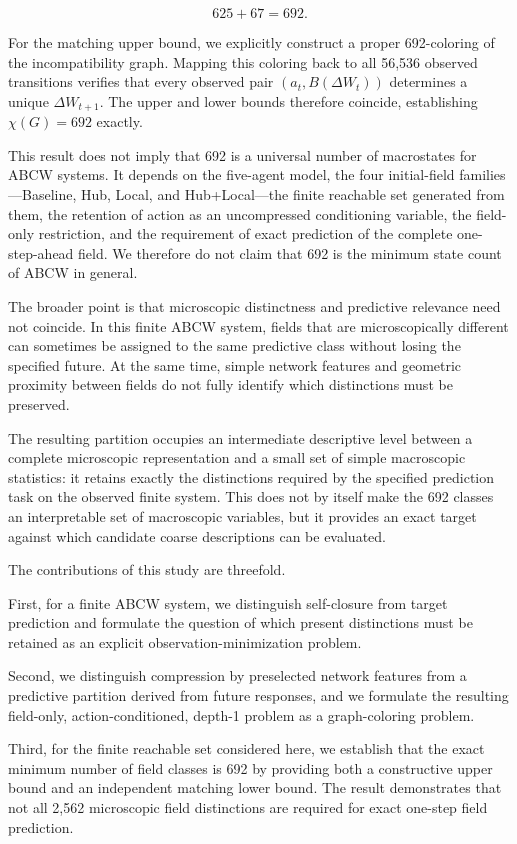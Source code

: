 \documentclass[
  11pt,
]{article}
\begin{document}
\[{625+67=692.}\]

For the matching upper bound, we explicitly construct a proper
692-coloring of the incompatibility graph. Mapping this coloring back to
all 56,536 observed transitions verifies that every observed pair
\({(a_t,B(\Delta W_t))}\) determines a unique \({\Delta W_{t+1}}\). The
upper and lower bounds therefore coincide, establishing
\({\chi(G)=692}\) exactly.

This result does not imply that 692 is a universal number of macrostates
for ABCW systems. It depends on the five-agent model, the four
initial-field families---Baseline, Hub, Local, and Hub+Local---the
finite reachable set generated from them, the retention of action as an
uncompressed conditioning variable, the field-only restriction, and the
requirement of exact prediction of the complete one-step-ahead field. We
therefore do not claim that 692 is the minimum state count of ABCW in
general.

The broader point is that microscopic distinctness and predictive
relevance need not coincide. In this finite ABCW system, fields that are
microscopically different can sometimes be assigned to the same
predictive class without losing the specified future. At the same time,
simple network features and geometric proximity between fields do not
fully identify which distinctions must be preserved.

The resulting partition occupies an intermediate descriptive level
between a complete microscopic representation and a small set of simple
macroscopic statistics: it retains exactly the distinctions required by
the specified prediction task on the observed finite system. This does
not by itself make the 692 classes an interpretable set of macroscopic
variables, but it provides an exact target against which candidate
coarse descriptions can be evaluated.

The contributions of this study are threefold.

First, for a finite ABCW system, we distinguish self-closure from target
prediction and formulate the question of which present distinctions must
be retained as an explicit observation-minimization problem.

Second, we distinguish compression by preselected network features from
a predictive partition derived from future responses, and we formulate
the resulting field-only, action-conditioned, depth-1 problem as a
graph-coloring problem.

Third, for the finite reachable set considered here, we establish that
the exact minimum number of field classes is 692 by providing both a
constructive upper bound and an independent matching lower bound. The
result demonstrates that not all 2,562 microscopic field distinctions
are required for exact one-step field prediction.
\end{document}

